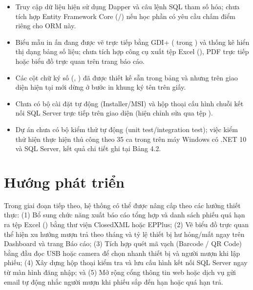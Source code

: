 \begin{itemize}

\item Truy cập dữ liệu hiện sử dụng Dapper và câu lệnh SQL tham số hóa; chưa tích hợp Entity Framework Core (/) nếu học phần có yêu cầu chấm điểm riêng cho ORM này.

\item Biểu mẫu in ấn đang được vẽ trực tiếp bằng GDI+ ( trong ) và thống kê hiển thị dạng bảng số liệu; chưa tích hợp công cụ xuất tệp Excel (), PDF trực tiếp hoặc biểu đồ trực quan trên trang báo cáo.

\item Các cột chữ ký số (, ) đã được thiết kế sẵn trong bảng  và  nhưng trên giao diện hiện tại mới dừng ở bước in khung ký tên trên giấy.

\item Chưa có bộ cài đặt tự động (Installer/MSI) và hộp thoại cấu hình chuỗi kết nối SQL Server trực tiếp trên giao diện (hiện chỉnh sửa qua tệp ).

\item Dự án chưa có bộ kiểm thử tự động (unit test/integration test); việc kiểm thử hiện thực hiện thủ công theo 35 ca trong  trên máy Windows có .NET 10 và SQL Server, kết quả chi tiết ghi tại Bảng 4.2.

\end{itemize}

\section{Hướng phát triển}

Trong giai đoạn tiếp theo, hệ thống có thể được nâng cấp theo các hướng thiết thực: (1) Bổ sung chức năng xuất báo cáo tổng hợp và danh sách phiếu quá hạn ra tệp Excel () bằng thư viện ClosedXML hoặc EPPlus; (2) Vẽ biểu đồ trực quan thể hiện xu hướng mượn trả theo tháng và tỷ lệ thiết bị hư hỏng/mất ngay trên Dashboard và trang Báo cáo; (3) Tích hợp quét mã vạch (Barcode / QR Code) bằng đầu đọc USB hoặc camera để chọn nhanh thiết bị và người mượn khi lập phiếu; (4) Xây dựng hộp thoại kiểm tra và lưu cấu hình kết nối SQL Server ngay từ màn hình đăng nhập; và (5) Mở rộng cổng thông tin web hoặc dịch vụ gửi email tự động nhắc người mượn khi phiếu sắp đến hạn hoặc quá hạn trả.



